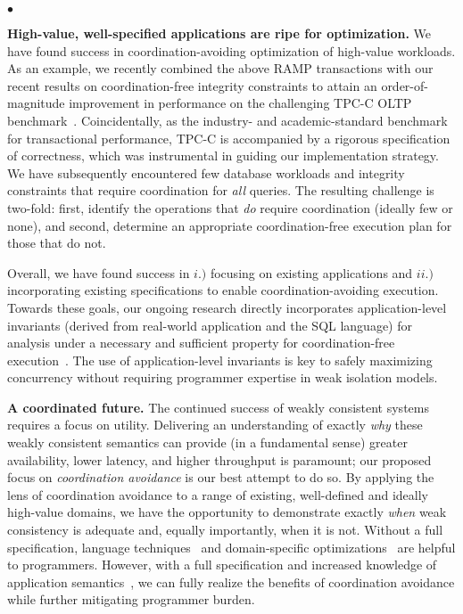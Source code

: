\documentclass[9pt]{article}
\theoremstyle{definition}
\theoremstyle{remark}
\newcommand{\minihead}[1]{{\vspace{.4em}\noindent\textbf{#1.} }}
\newenvironment{myitemize}
{
  \vspace{-.5em}
    \begin{list}{$\bullet$ }{}
        \setlength{\topsep}{0em}
        \setlength{\parskip}{0pt}
        \setlength{\partopsep}{0pt}
        \setlength{\parsep}{0pt}         
        \setlength{\itemsep}{.4em} 
        \setlength{\itemindent}{0em}
}
{
    \end{list} 
    \vspace{-.5em}
}
\begin{document}
\begin{myitemize}
\item \textbf{High-value, well-specified applications are ripe for optimization.} We have found success in coordination-avoiding optimization of high-value workloads. As an example, we recently combined the above RAMP transactions with our recent results on coordination-free integrity constraints to attain an order-of-magnitude improvement in performance on the challenging TPC-C OLTP benchmark~\cite{coord-avoid,tpcc}. Coincidentally, as the industry- and academic-standard benchmark for transactional performance, TPC-C is accompanied by a rigorous specification of correctness, which was instrumental in guiding our implementation strategy. We have subsequently encountered few database workloads and integrity constraints that require coordination for \textit{all} queries. The resulting challenge is two-fold: first, identify the operations that \textit{do} require coordination (ideally few or none), and second, determine an appropriate coordination-free execution plan for those that do not.  \end{myitemize}

Overall, we have found success in $i.)$ focusing on existing applications and $ii.)$ incorporating existing specifications to enable coordination-avoiding execution. Towards these goals, our ongoing research directly incorporates application-level invariants (derived from real-world application and the SQL language) for analysis under a necessary and sufficient property for coordination-free execution~\cite{coord-avoid}. The use of application-level invariants is key to safely maximizing concurrency without requiring programmer expertise in weak isolation models.

\minihead{A coordinated future} The continued success of weakly consistent systems requires a focus on utility. Delivering an understanding of exactly \textit{why} these weakly consistent semantics can provide (in a fundamental sense) greater availability, lower latency, and higher throughput is paramount; our proposed focus on \textit{coordination avoidance} is our best attempt to do so. By applying the lens of coordination avoidance to a range of existing, well-defined and ideally high-value domains, we have the opportunity to demonstrate exactly \textit{when} weak consistency is adequate and, equally importantly, when it is not. Without a full specification, language techniques~\cite{calm,blazes} and domain-specific optimizations~\cite{crdt} are helpful to programmers. However, with a full specification and increased knowledge of application semantics~\cite{coord-avoid,ramp-txns}, we can fully realize the benefits of coordination avoidance while further mitigating programmer burden.
\end{document}
